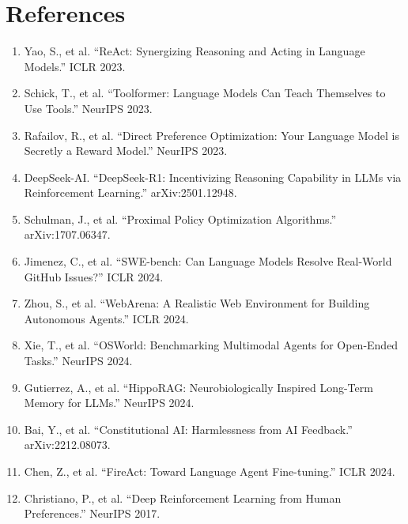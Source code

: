 \documentclass[12pt]{article}
\begin{document}
\section*{References}

\begin{enumerate}
    \item Yao, S., et al. ``ReAct: Synergizing Reasoning and Acting in Language Models.'' ICLR 2023.
    \item Schick, T., et al. ``Toolformer: Language Models Can Teach Themselves to Use Tools.'' NeurIPS 2023.
    \item Rafailov, R., et al. ``Direct Preference Optimization: Your Language Model is Secretly a Reward Model.'' NeurIPS 2023.
    \item DeepSeek-AI. ``DeepSeek-R1: Incentivizing Reasoning Capability in LLMs via Reinforcement Learning.'' arXiv:2501.12948.
    \item Schulman, J., et al. ``Proximal Policy Optimization Algorithms.'' arXiv:1707.06347.
    \item Jimenez, C., et al. ``SWE-bench: Can Language Models Resolve Real-World GitHub Issues?'' ICLR 2024.
    \item Zhou, S., et al. ``WebArena: A Realistic Web Environment for Building Autonomous Agents.'' ICLR 2024.
    \item Xie, T., et al. ``OSWorld: Benchmarking Multimodal Agents for Open-Ended Tasks.'' NeurIPS 2024.
    \item Gutierrez, A., et al. ``HippoRAG: Neurobiologically Inspired Long-Term Memory for LLMs.'' NeurIPS 2024.
    \item Bai, Y., et al. ``Constitutional AI: Harmlessness from AI Feedback.'' arXiv:2212.08073.
    \item Chen, Z., et al. ``FireAct: Toward Language Agent Fine-tuning.'' ICLR 2024.
    \item Christiano, P., et al. ``Deep Reinforcement Learning from Human Preferences.'' NeurIPS 2017.
\end{enumerate}
\end{document}
